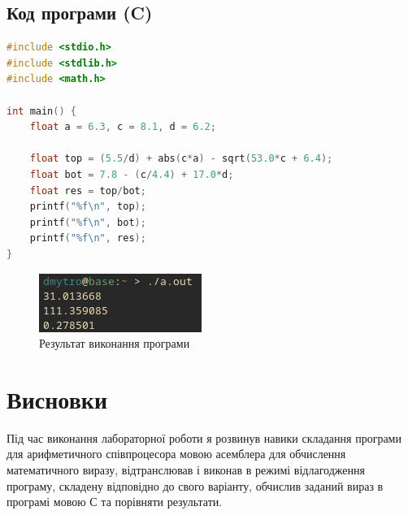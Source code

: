 \documentclass{article}
\begin{document}
\begin{normalsize}
\subsection*{Код програми (C)}
\begin{lstlisting}[language={C}]
#include <stdio.h>
#include <stdlib.h>
#include <math.h>

int main() {
	float a = 6.3, c = 8.1, d = 6.2;
	
	float top = (5.5/d) + abs(c*a) - sqrt(53.0*c + 6.4);
	float bot = 7.8 - (c/4.4) + 17.0*d;
	float res = top/bot;
	printf("%f\n", top);
	printf("%f\n", bot);
	printf("%f\n", res);
}

\end{lstlisting}

	\begin{figure}[H]
		\centering
		\includegraphics[scale=1]{2}
		\caption{Результат виконання програми}
	\end{figure}

	\section*{Висновки}
	Під час виконання лабораторної роботи я розвинув навики складання програми для арифметичного співпроцесора мовою асемблера для обчислення математичного виразу, відтранслював і виконав в режимі відлагодження програму, складену відповідно до свого варіанту, обчислив заданий вираз в програмі мовою С та порівняти результати.
	    
\end{normalsize}
\end{document}
